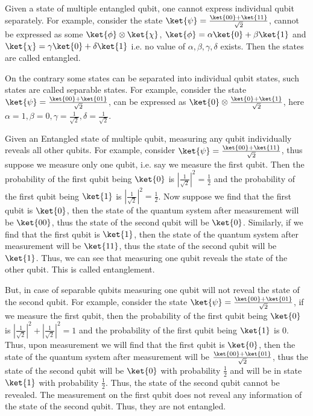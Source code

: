 \documentclass[12pt, oneside]{book}
\theoremstyle{definition}
\theoremstyle{definition}
\theoremstyle{remark}
\begin{document}
Given a state of multiple entangled qubit, one cannot express individual qubit separately.
For example, consider the state $\ket{\psi} = \frac{\ket{00}+\ket{11}}{\sqrt{2}}$, cannot be expressed as some $\ket{\phi} \otimes \ket{\chi}$,
$\ket{\phi}=\alpha \ket{0} + \beta \ket{1}$ and $\ket{\chi}=\gamma \ket{0} + \delta \ket{1}$ i.e. no value of $\alpha, \beta, \gamma, \delta$ exists. Then the states are called entangled.

On the contrary some states can be separated into individual qubit states, such states are called separable states.
For example, consider the state $\ket{\psi} = \frac{\ket{00}+\ket{01}}{\sqrt{2}}$, can be expressed as $\ket{0} \otimes \frac{\ket{0}+\ket{1}}{\sqrt{2}}$, here
$\alpha =1 ,\beta =0,\gamma = \frac{1}{\sqrt{2}},\delta = \frac{1}{\sqrt{2}}$.

Given an Entangled state of multiple qubit, measuring any qubit individually reveals all other qubits. 
For example, consider $\ket{\psi}=\frac{\ket{00}+\ket{11}}{\sqrt{2}}$, thus suppose we measure only one qubit, i.e.
say we measure the first qubit. Then the probability of the first qubit being $\ket{0}$ is $|\frac{1}{\sqrt{2}}|^2=\frac{1}{2}$ and the probability of the first qubit being $\ket{1}$ is $|\frac{1}{\sqrt{2}}|^2=\frac{1}{2}$.
Now suppose we find that the first qubit is $\ket{0}$, then the state of the quantum system after measurement will be $\ket{00}$, thus the state of the second qubit will be $\ket{0}$.
Similarly, if we find that the first qubit is $\ket{1}$, then the state of the quantum system after measurement will be $\ket{11}$, thus the state of the second qubit will be $\ket{1}$.
Thus, we can see that measuring one qubit reveals the state of the other qubit. This is called entanglement.

But, in case of separable qubits measuring one qubit will not reveal the state of the second qubit. For example, consider the state $\ket{\psi}=\frac{\ket{00}+\ket{01}}{\sqrt{2}}$,
if we measure the first qubit, then the probability of the first qubit being $\ket{0}$ is $|\frac{1}{\sqrt{2}}|^2+|\frac{1}{\sqrt{2}}|^2=1$ and the probability of the first qubit being $\ket{1}$ is $0$.
Thus, upon measurement we will find that the first qubit is $\ket{0}$, then the state of the quantum system after measurement will be $\frac{\ket{00}+\ket{01}}{\sqrt{2}}$, thus the state of the second qubit will be $\ket{0}$ with probability $\frac{1}{2}$ and 
will be in state $\ket{1}$ with probability $\frac{1}{2}$. Thus, the state of the second qubit cannot be revealed. The measurement on the first qubit does not reveal any information of the state of the second qubit. Thus, they are not entangled.
\end{document}
